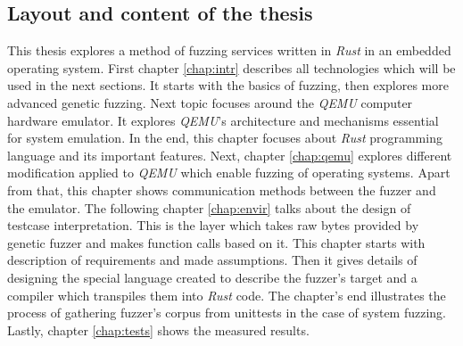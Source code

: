 \subsection{Layout and content of the thesis}
This thesis explores a method of fuzzing services written in \textit{Rust} in an embedded operating system. First chapter \ref{chap:intr} describes all technologies which will be used in the next sections. It starts with the basics of fuzzing, then explores more advanced genetic fuzzing. Next topic focuses around the \textit{QEMU} computer hardware emulator. It explores \textit{QEMU}'s architecture and mechanisms essential for system emulation. In the end, this chapter focuses about \textit{Rust} programming language and its important features. Next, chapter \ref{chap:qemu} explores different modification applied to \textit{QEMU} which enable fuzzing of operating systems. Apart from that, this chapter shows communication methods between the fuzzer and the emulator. The following chapter \ref{chap:envir} talks about the design of testcase interpretation. This is the layer which takes raw bytes provided by genetic fuzzer and makes function calls based on it. This chapter starts with description of requirements and made assumptions. Then it gives details of designing the special language created to describe the fuzzer's target and a compiler which transpiles them into \textit{Rust} code. The chapter's end illustrates the process of gathering fuzzer's corpus from unittests in the case of system fuzzing. Lastly, chapter \ref{chap:tests} shows the measured results.